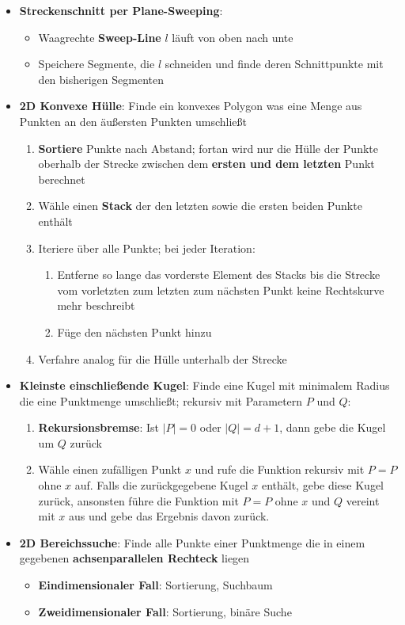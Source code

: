 \documentclass[10pt,a4paper]{article}
\begin{document}
	\begin{itemize}
		\item \textbf{Streckenschnitt per Plane-Sweeping}:
		\begin{itemize}
			\item Waagrechte \textbf{Sweep-Line} $l$ läuft von oben nach unte
			\item Speichere Segmente, die $l$ schneiden und finde deren Schnittpunkte mit den bisherigen Segmenten
		\end{itemize}
		\item \textbf{2D Konvexe Hülle}: Finde ein konvexes Polygon was eine Menge aus Punkten an den äußersten Punkten umschließt
		\begin{enumerate}
			\item \textbf{Sortiere} Punkte nach Abstand; fortan wird nur die Hülle der Punkte oberhalb der Strecke zwischen dem \textbf{ersten und dem letzten} Punkt berechnet
			\item Wähle einen \textbf{Stack} der den letzten sowie die ersten beiden Punkte enthält
			\item Iteriere über alle Punkte; bei jeder Iteration:
			\begin{enumerate}
				\item Entferne so lange das vorderste Element des Stacks bis die Strecke vom vorletzten zum letzten zum nächsten Punkt keine Rechtskurve mehr beschreibt
				\item Füge den nächsten Punkt hinzu
			\end{enumerate}
			\item Verfahre analog für die Hülle unterhalb der Strecke
		\end{enumerate}
		\item \textbf{Kleinste einschließende Kugel}: Finde eine Kugel mit minimalem Radius die eine Punktmenge umschließt; rekursiv mit Parametern $P$ und $Q$:
		\begin{enumerate}
			\item \textbf{Rekursionsbremse}: Ist $|P| = 0$ oder $|Q| = d + 1$, dann gebe die Kugel um $Q$ zurück
			\item Wähle einen zufälligen Punkt $x$ und rufe die Funktion rekursiv mit $P = P$ ohne $x$ auf. Falls die zurückgegebene Kugel $x$ enthält, gebe diese Kugel zurück, ansonsten führe die Funktion mit $P = P$ ohne $x$ und $Q$ vereint mit $x$ aus und gebe das Ergebnis davon zurück.
		\end{enumerate}
		\item \textbf{2D Bereichssuche}: Finde alle Punkte einer Punktmenge die in einem gegebenen \textbf{achsenparallelen Rechteck} liegen
		\begin{itemize}
			\item \textbf{Eindimensionaler Fall}: Sortierung, Suchbaum
			\item \textbf{Zweidimensionaler Fall}: Sortierung, binäre Suche
		\end{itemize}
	\end{itemize}
\end{document}
